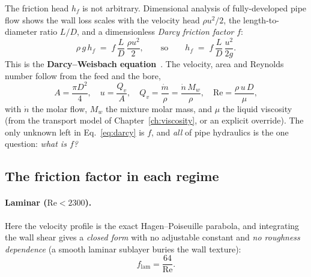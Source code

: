 \documentclass[11pt,a4paper]{article}
\begin{document}
The friction head $h_f$ is not arbitrary.  Dimensional analysis of
fully-developed pipe flow shows the wall loss scales with the velocity head
$\rho u^2/2$, the length-to-diameter ratio $L/D$, and a dimensionless
\emph{Darcy friction factor} $f$:
\begin{equation}
   \rho\,g\,h_f \;=\; f\,\frac{L}{D}\,\frac{\rho u^2}{2},
   \qquad\text{so}\qquad
   h_f \;=\; f\,\frac{L}{D}\,\frac{u^2}{2g}.
   \label{eq:darcy}
\end{equation}
This is the \textbf{Darcy--Weisbach equation}~\cite{Weisbach1845}.  The
velocity, area and Reynolds number follow from the feed and the bore,
\begin{equation}
   A = \frac{\pi D^2}{4},\quad
   u = \frac{Q_v}{A},\quad
   Q_v = \frac{\dot m}{\rho} = \frac{\dot n\,M_w}{\rho},\quad
   \mathrm{Re} = \frac{\rho\,u\,D}{\mu},
\end{equation}
with $\dot n$ the molar flow, $M_w$ the mixture molar mass, and $\mu$ the
liquid viscosity (from the  transport model of
Chapter~\ref{ch:viscosity}, or an explicit  override).
The only unknown left in Eq.~\eqref{eq:darcy} is $f$, and \emph{all} of
pipe hydraulics is the one question: \emph{what is $f$?}

\subsection{The friction factor in each regime}

\paragraph{Laminar ($\mathrm{Re} < 2300$).}  Here the velocity profile is
the exact Hagen--Poiseuille parabola, and integrating the wall shear gives
a \emph{closed form} with no adjustable constant and \emph{no roughness
dependence} (a smooth laminar sublayer buries the wall texture):
\begin{equation}
   f_{\text{lam}} = \frac{64}{\mathrm{Re}}.
   \label{eq:lam}
\end{equation}
\end{document}
